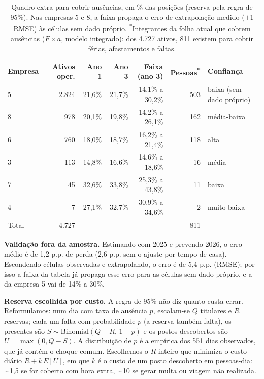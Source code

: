 \documentclass[11pt,a4paper]{article}
\begin{document}
\begin{table}[h]
\centering\small
\begin{tabular}{lrrrrrl}
\toprule
Empresa & Ativos oper. & Ano 1 & Ano 3 & Faixa (ano 3) & Pessoas\textsuperscript{*} & Confiança \\
\midrule
5 & 2.824 & 21,6\% & 21,7\% & 14,1\% a 30,2\% & 503 & baixa (sem dado próprio) \\
8 & 978 & 20,1\% & 19,8\% & 14,2\% a 26,1\% & 162 & média-baixa \\
6 & 760 & 18,0\% & 18,7\% & 16,2\% a 21,4\% & 118 & alta \\
3 & 113 & 14,8\% & 16,6\% & 14,6\% a 18,6\% & 16 & média \\
7 & 45 & 32,6\% & 33,8\% & 25,3\% a 43,8\% & 11 & baixa \\
4 & 7 & 27,1\% & 32,7\% & 30,9\% a 34,6\% & 2 & muito baixa \\
\midrule
Total & 4.727 & & & & 811 & \\
\bottomrule
\end{tabular}
\caption{Quadro extra para cobrir ausências, em \% das posições (reserva pela regra de 95\%). Nas empresas 5 e 8, a faixa propaga o erro de extrapolação medido ($\pm$1 RMSE) às células sem dado próprio. \textsuperscript{*}Integrantes da folha atual que cobrem ausências ($F \times a$, modelo integrado): dos 4.727 ativos, 811 existem para cobrir férias, afastamentos e faltas.}
\end{table}

\textbf{Validação fora da amostra.} Estimando com 2025 e prevendo 2026, o erro médio é de 1,2 p.p. de perda (2,6 p.p. sem o ajuste por tempo de casa). Escondendo células observadas e extrapolando, o erro é de 5,4 p.p. (RMSE); por isso a faixa da tabela já propaga esse erro para as células sem dado próprio, e a da empresa 5 vai de 14\% a 30\%.

\textbf{Reserva escolhida por custo.} A regra de 95\% não diz quanto custa errar. Reformulamos: num dia com taxa de ausência $p$, escalam-se $Q$ titulares e $R$ reservas; cada um falta com probabilidade $p$ (a reserva também falta), os presentes são $S\sim\text{Binomial}(Q+R,\,1-p)$ e os postos descobertos são $U=\max(0,Q-S)$. A distribuição de $p$ é a empírica dos 551 dias observados, que já contém o choque comum. Escolhemos o $R$ inteiro que minimiza o custo diário $R + k\,E[U]$, em que $k$ é o custo de um posto descoberto em pessoas-dia: $\sim$1,5 se for coberto com hora extra, $\sim$10 se gerar multa ou viagem não realizada.
\end{document}
